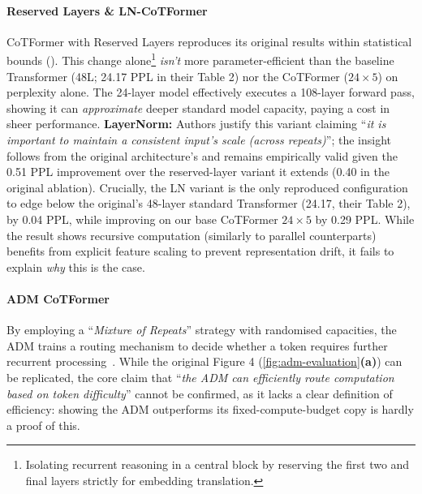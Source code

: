 \documentclass[10pt]{article}
\begin{document}
\paragraph{Reserved Layers \& LN-CoTFormer}\label{sec:RLLN}
CoTFormer with Reserved Layers reproduces its original results within statistical bounds (). This change alone\footnote{Isolating recurrent reasoning in a central block by reserving the first two and final layers strictly for embedding translation.} \emph{isn't} more parameter-efficient than the baseline Transformer (48L; 24.17 PPL in their Table 2) nor the CoTFormer ($24\times5$) on perplexity alone. The 24-layer model effectively executes a 108-layer forward pass, showing it can \emph{approximate} deeper standard model capacity, paying a cost in sheer performance. \textbf{LayerNorm:} Authors justify this variant claiming ``\emph{it is important to maintain a consistent input’s scale (across repeats)}''; the insight follows from the original architecture's \citep{vaswani2017attention} and remains empirically valid given the 0.51 PPL improvement over the reserved-layer variant it extends (0.40 in the original ablation). Crucially, the LN variant is the only reproduced configuration to edge below the original's 48-layer standard Transformer (24.17, their Table 2), by 0.04 PPL, while improving on our base CoTFormer $24\times5$ by 0.29 PPL. While the result shows recursive computation (similarly to parallel counterparts) benefits from explicit feature scaling to prevent representation drift, it fails to explain \emph{why} this is the case.

\paragraph{ADM CoTFormer}\label{sec:ADM} By employing a ``\emph{Mixture of Repeats}'' strategy with randomised capacities, the ADM trains a routing mechanism to decide whether a token requires further recurrent processing~\citep{cotformer}. While the original Figure 4 (\cref{fig:adm-evaluation}\textbf{(a)}) can be replicated, the core claim that ``\emph{the ADM can efficiently route computation based on token difficulty}'' cannot be confirmed, as it lacks a clear definition of efficiency: showing the ADM outperforms its fixed-compute-budget copy is hardly a proof of this. 
\end{document}
